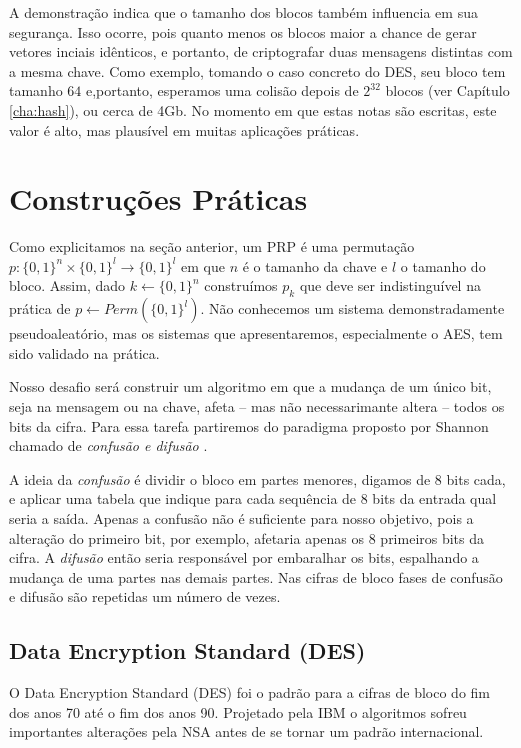 A demonstração indica que o tamanho dos blocos também influencia em sua segurança.
Isso ocorre, pois quanto menos os blocos maior a chance de gerar vetores inciais idênticos, e portanto, de criptografar duas mensagens distintas com a mesma chave.
Como exemplo, tomando o caso concreto do DES, seu bloco tem tamanho $64$ e,portanto, esperamos uma colisão depois de $2^{32}$ blocos (ver Capítulo \ref{cha:hash}), ou cerca de 4Gb.
No momento em que estas notas são escritas, este valor é alto, mas plausível em muitas aplicações práticas.

\section{Construções Práticas}
\label{sec:construcoes-praticas}
Como explicitamos na seção anterior, um PRP é uma permutação $p: \{0,1\}^n \times \{0,1\}^l \to \{0,1\}^l$ em que $n$ é o tamanho da chave e $l$ o tamanho do bloco.
Assim, dado $k \leftarrow \{0,1\}^n$ construímos $p_k$ que deve ser indistinguível na prática de $p \leftarrow Perm(\{0,1\}^l)$.
Não conhecemos um sistema demonstradamente pseudoaleatório, mas os sistemas que apresentaremos, especialmente o AES, tem sido validado na prática.

Nosso desafio será construir um algoritmo em que a mudança de um único bit, seja na mensagem ou na chave, afeta -- mas não necessarimante altera -- todos os bits da cifra.
Para essa tarefa partiremos do paradigma proposto por Shannon chamado de {\em confusão e difusão} \cite{Shannon49}.

A ideia da {\em confusão} é dividir o bloco em partes menores, digamos de 8 bits cada, e aplicar uma tabela que indique para cada sequência de 8 bits da entrada qual seria a saída.
Apenas a confusão não é suficiente para nosso objetivo, pois a alteração do primeiro bit, por exemplo, afetaria apenas os 8 primeiros bits da cifra.
A {\em difusão} então seria responsável por embaralhar os bits, espalhando a mudança de uma partes nas demais partes.
Nas cifras de bloco fases de confusão e difusão são repetidas um número de vezes.

\subsection{Data Encryption Standard (DES)}
\label{sec:des}

O Data Encryption Standard (DES) foi o padrão para a cifras de bloco do fim dos anos 70 até o fim dos anos 90.
Projetado pela IBM o algoritmos sofreu importantes alterações pela NSA antes de se tornar um padrão internacional.

